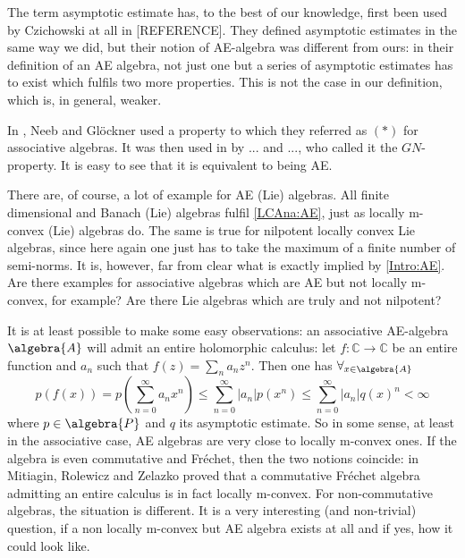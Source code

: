 \begin{remark}
	\label{Rem:AE2}
	\mbox{}
	\begin{remarklist}
		\item
		The term asymptotic estimate has, to the best of our knowledge, 
		first been used by Czichowski at all in [REFERENCE]. They 
		defined asymptotic estimates in the same way we did, but their 
		notion of AE-algebra was different from ours: in their 
		definition of an AE algebra, not just one but a series of 
		asymptotic estimates has to exist which fulfils two more 
		properties. This is not the case in our definition, which is, in 
		general, weaker.
		
		\item
		In \cite{}, Neeb and Gl\"ockner used a property to which they 
		referred as $(*)$ for associative algebras. It was then used in 
		\cite{} by ... and ..., who called it the $GN$-property. It is 
		easy to see that it is equivalent to being AE. 
		
		\item
		There are, of course, a lot of example for AE (Lie) algebras. 
		All finite dimensional and Banach (Lie) algebras fulfil 
		\eqref{LCAna:AE}, just as locally m-convex (Lie) algebras do. 
		The same is true for nilpotent locally convex Lie algebras, 
		since here again one just has to take the maximum of a finite 
		number of semi-norms. It is, however, far from clear what is exactly 
		implied by \eqref{Intro:AE}. Are there examples for associative 
		algebras which are AE but not locally m-convex, for example? Are there 
		Lie algebras which are truly and not nilpotent?
	\end{remarklist}
\end{remark}
It is at least possible to make some easy observations: an associative 
AE-algebra $\algebra{A}$ will admit an entire holomorphic calculus: let 
$f \colon \mathbb{C} \longrightarrow \mathbb{C}$ be an entire function 
and $a_n$ such that $f(z) = \sum_n a_n z^n$. Then one has 
$\forall_{x \in \algebra{A}}$
\begin{equation*}
	p(f(x))
	=
	p \left(
		\sum\limits_{n=0}^{\infty}
		a_n x^n
	\right)
	\leq
	\sum\limits_{n=0}^{\infty}
	|a_n| 
	p \left( x^n \right)
	\leq
	\sum\limits_{n=0}^{\infty}
	|a_n| q(x)^n
	<
	\infty
\end{equation*}
where $p \in \algebra{P}$ and $q$ its asymptotic estimate. So in some sense, 
at least in the associative case, AE algebras are very close to locally 
m-convex ones. If the algebra is even commutative and Fr\'echet, then the two 
notions coincide: in \cite{MRZ:1962:EntireCalculus} Mitiagin, Rolewicz and 
Zelazko proved that a commutative Fr\'echet algebra admitting an entire 
calculus is in fact locally m-convex. For non-commutative algebras, the 
situation is different. It is a very interesting (and non-trivial) question, 
if a non locally m-convex but AE algebra exists at all and if yes, how it 
could look like.



